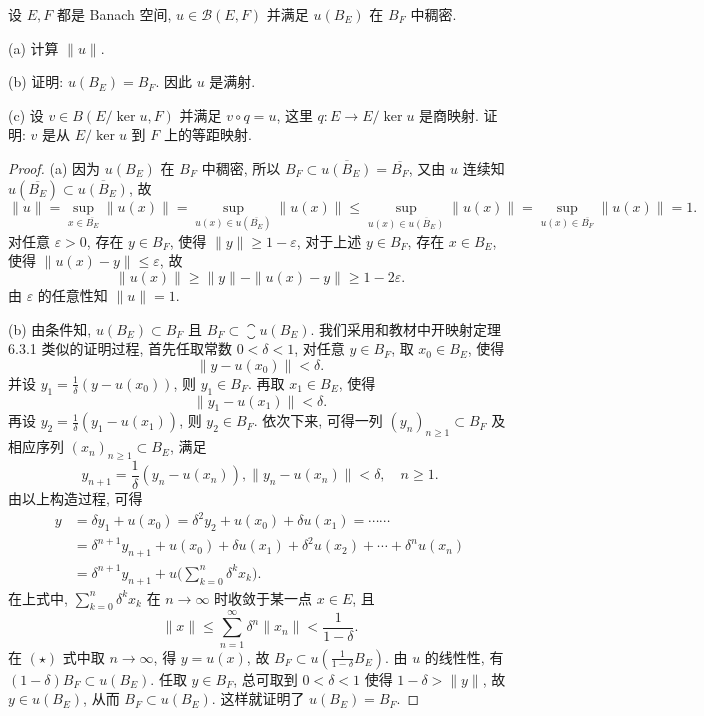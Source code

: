 \begin{exercise}[10]
    设 $E,F$ 都是 Banach 空间, $u\in\mathcal{B}(E,F)$ 并满足 $u(B_E)$ 在 $B_F$ 中稠密.

    (a) 计算 $\|u\|$.

    (b) 证明: $u(B_E)=B_F$. 因此 $u$ 是满射.

    (c) 设 $v\in B(E/\ker u,F)$ 并满足 $v\circ q=u$, 这里 $q:E\to E/\ker u$
    是商映射. 证明: $v$ 是从 $E/\ker u$ 到 $F$ 上的等距映射.
\end{exercise}

\begin{proof}
    (a) 因为 $u(B_E)$ 在 $B_F$ 中稠密,
    所以 $B_F\subset\overline{u(B_E)}=\overline{B_F}$,
    又由 $u$ 连续知 $u(\overline{B_E})\subset\overline{u(B_E)}$, 故
    \[\|u\|=\sup_{x\in\overline{B_E}}\|u(x)\|=\sup_{u(x)\in u(\overline{B_E})}\|u(x)\|\leq\sup_{u(x)\in \overline{u(B_E)}}\|u(x)\|=\sup_{u(x)\in\overline{B_F}}\|u(x)\|=1.\]
    对任意 $\varepsilon>0$, 存在 $y\in B_F$,
    使得 $\|y\|\geq 1-\varepsilon$, 对于上述 $y\in B_F$, 存在 $x\in B_E$,
    使得 $\|u(x)-y\|\leq\varepsilon$, 故
    \[\|u(x)\|\geq\|y\|-\|u(x)-y\|\geq 1-2\varepsilon.\]
    由 $\varepsilon$ 的任意性知 $\|u\|=1$.

    (b) 由条件知, $u(B_{E})\subset B_{F}$ 且 $B_{F}\subset\closure{u\left(B_{E}\right)}$. 
    我们采用和教材中开映射定理 6.3.1 类似的证明过程, 首先任取常数 $0<\delta<1$, 对任意 $y\in B_{F}$, 取 $x_0\in B_{E}$, 使得
    \[
    \|y-u(x_0)\|<\delta.
    \] 
    并设 $y_{1}=\frac{1}{\delta}(y-u(x_{0}))$, 则 $y_1\in B_F$. 再取 $x_1\in B_E$, 使得
    \[
    \|y_{1}-u(x_{1})\|<\delta .
    \]
    再设 $y_2=\frac{1}{\delta}(y_1-u(x_1))$, 则 $y_2\in B_F$. 依次下来, 
    可得一列 $(y_n)_{n\geq 1}\subset B_F$ 及相应序列 $(x_n)_{n\geq 1}\subset B_E$, 满足
    \[
    y_{n+1}=\frac{1}{\delta}(y_n-u(x_n)),\|y_{n}-u(x_{n})\|<\delta, \quad n\geq 1.
    \]
    由以上构造过程, 可得
    \begin{equation}
        \begin{aligned}
            y &=\delta y_{1}+u(x_{0})=\delta^{2} y_{2}+u(x_{0})+\delta u(x_{1})=\cdots \cdots \\
            &=\delta^{n+1} y_{n+1}+u(x_{0})+\delta u(x_{1})+\delta^{2} u(x_{2})+\cdots+\delta^{n} u(x_{n}) \\
            &=\delta^{n+1} y_{n+1}+u\biggl(\sum_{k=0}^{n} \delta^{k} x_{k}\biggr).
        \end{aligned}\tag{$\star$}
    \end{equation}
    在上式中, $\sum_{k=0}^n \delta^k x_k$ 在 $n\to\infty$ 时收敛于某一点 $x\in E$, 且
    \[\|x\|\leq\sum_{n=1}^{\infty}\delta^n\|x_n\|<\frac{1}{1-\delta}.\]
    在 $(\star)$ 式中取 $n\to\infty$, 得 $y=u(x)$, 故 $B_F\subset u(\frac{1}{1-\delta}B_E)$.
    由 $u$ 的线性性, 有 $(1-\delta)B_F\subset u(B_E)$.
    任取 $y\in B_F$, 总可取到 $0<\delta<1$ 使得 $1-\delta>\|y\|$, 故
    $y\in u(B_E)$, 从而 $B_F\subset u(B_E)$. 这样就证明了 $u(B_E)=B_F$.


\end{proof}
